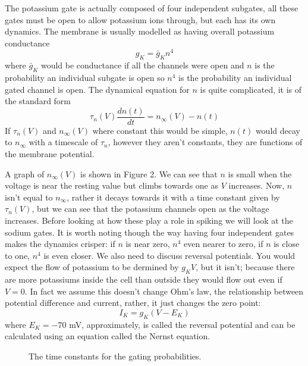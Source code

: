 \documentclass[11pt,a4paper]{scrartcl}
\begin{document}
The potassium gate is actually composed of four independent subgates,
all these gates must be open to allow potassium ions through, but each
has its own dynamics. The membrane is usually modelled as having
overall potassium conductance 
\begin{equation}
g_{K}=\bar{g}_Kn^4
\end{equation}
where $\bar{g}_K$ would be conductance if all the channels were open
and $n$ is the probability an individual subgate is open so $n^4$ is
the probability an individual gated channel is open. The dynamical equation for $n$ is quite complicated, it is of the standard form
\begin{equation}
\tau_n(V)\frac{dn(t)}{dt}=n_\infty(V)-n(t)
\end{equation}
If $\tau_n(V)$ and $n_\infty(V)$ where constant this would be simple,
$n(t)$ would decay to $n_\infty$ with a timescale of $\tau_n$, however
they aren't constants, they are functions of the membrane potential. 

A graph of $n_\infty(V)$ is shown in Figure 2. We can see that $n$ is
small when the voltage is near the resting value but climbs towards
one as $V$ increases. Now, $n$ isn't equal to $n_\infty$, rather it
decays towards it with a time constant given by $\tau_n(V)$, but we
can see that the potassium channels open as the voltage
increases. Before looking at how these play a role in spiking we will
look at the sodium gates. It is worth noting though the way having
four independent gates makes the dynamics crisper: if $n$ is near
zero, $n^4$ even nearer to zero, if $n$ is close to one, $n^4$ is even
closer. We also need to discuss reversal potentials. You would expect
the flow of potassium to be dermined by $g_KV$, but it isn't; because
there are more potassiums inside the cell than outside they would flow
out even if $V=0$. In fact we assume this doesn't change Ohm's law,
the relationship between potential difference and current, rather, it
just changes the zero point:
\begin{equation}
I_K=g_K(V-E_K)
\end{equation}
where $E_K=-70$ mV, approximately, is called the reversal potential and can be calculated using an equation called the Nernst equation.


\begin{figure}
\begin{center}

\end{center}
\caption{The time constants for the gating probabilities.\label{fig:tau_vals}}
\end{figure}
\end{document}
